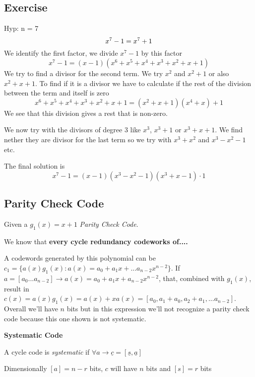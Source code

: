 \subsection{Exercise}
Hyp: n = 7
\begin{equation}
x^7 - 1 = x^7 + 1\\
\end{equation}
 We identify the first factor, we divide $x^7 - 1$ by this factor 
\begin{equation}
x^7 - 1 = (x - 1)(x^6 + x^5 + x^4 + x^3 + x^2 + x + 1)
\end{equation}
We try to find a divisor for the second term. We try $x^2$ and $x^2 + 1$ or also $x^2 + x + 1$. To find if it is a divisor we have to calculate if the rest of the division between the term and itself is zero  
\begin{equation}
x^6 + x^5 + x^4 + x^3 + x^2 + x + 1 = (x^2 + x + 1)(x^4 + x) + 1
\end{equation}
We see that this division gives a rest that is non-zero. 

We now try with the divisors of degree 3 like $x^3$, $x^3 + 1$ or $x^3 + x + 1$. We find nether they are divisor for the last term so we try with $x^3 + x^2$ and $x^3 - x^2 - 1$ etc.

The final solution is
\begin{equation}
x^7 - 1 = (x - 1)(x^3 - x^2 - 1)(x^3 + x - 1)\cdot 1
\end{equation}

\subsection{Parity Check Code}
Given a $g_1(x) = x + 1$ \emph{Parity Check Code}.

We know that \textbf{every cycle redundancy codeworks of....}

A codewords generated by this polynomial can be $c_1 = \{a(x)g_1(x): a(x) = a_0 + a_1x + ... a_{n-2}x^{n-2}\}$. 
If $a = [a_0 ... a_{n-2}] \rightarrow a(x) = a_0 + a_1x + a_{n-2}x^{n-2}$, that, combined with $g_1(x)$, result in $c(x) = a(x)g_1(x) = a(x) + xa(x) = [a_0, a_1+a_0, a_2+a_1, ... a_{n-2}]$. Overall we'll have $n$ bits but in this expression we'll not recognize a parity check code because this one shown is not systematic.

\begin{definition}{\textbf{Systematic Code}}

A cycle code is \emph{systematic} if 
$\forall a \rightarrow \underline{c} = [\underline{s},\underline{a}]$

Dimensionally $[a] = n - r$ bits, $c$ will have $n$ bits and $[s] = r$ bits
\end{definition}
 
